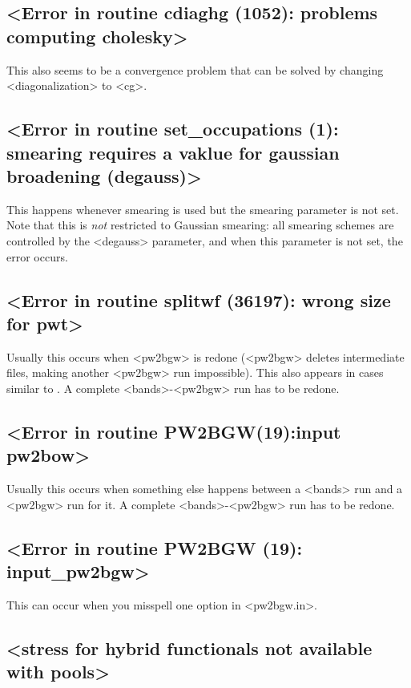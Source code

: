 \documentclass[hyperref, a4paper, 12pt]{report}
\def\texttt#1{<#1>}%
\newcommand{\shortcode}[1]{\texttt{#1}}
\begin{document}
\subsection{\shortcode{Error in routine  cdiaghg (1052):  problems computing cholesky}}

This also seems to be a convergence problem 
that can be solved by changing \shortcode{diagonalization} to \shortcode{cg}.

\subsection{\shortcode{Error in routine  set_occupations (1): smearing requires a vaklue for gaussian broadening (degauss)}}

This happens whenever smearing is used 
but the smearing parameter is not set.
Note that this is \emph{not} restricted to Gaussian smearing:
all smearing schemes are controlled by the \shortcode{degauss} parameter, 
and when this parameter is not set, 
the error occurs.

\subsection{\shortcode{Error in routine  splitwf (36197): wrong size for pwt}}

Usually this occurs when \shortcode{pw2bgw} is redone
(\shortcode{pw2bgw} deletes intermediate files, 
making another \shortcode{pw2bgw} run impossible).
This also appears in cases similar to .
A complete \shortcode{bands}-\shortcode{pw2bgw} run has to be redone.

\subsection{\shortcode{Error in routine PW2BGW(19):input pw2bow}}

Usually this occurs when something else happens between a \shortcode{bands} run 
and a \shortcode{pw2bgw} run for it.
A complete \shortcode{bands}-\shortcode{pw2bgw} run has to be redone.

\subsection{\shortcode{Error in routine PW2BGW (19): input_pw2bgw}}

This can occur when you misspell one option in \shortcode{pw2bgw.in}.

\subsection{\shortcode{stress for hybrid functionals not available with pools}}
\end{document}
